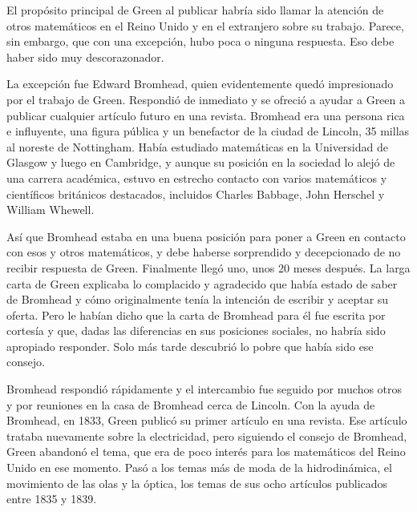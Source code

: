 \par
El propósito principal de Green al publicar habría sido llamar la atención de otros matemáticos en el Reino Unido y en el extranjero sobre su trabajo. Parece, sin embargo, que con una excepción, hubo poca o ninguna respuesta. Eso debe haber sido muy descorazonador.
\par
La excepción fue Edward Bromhead, quien evidentemente quedó impresionado por el trabajo de Green. Respondió de inmediato y se ofreció a ayudar a Green a publicar cualquier artículo futuro en una revista. Bromhead era una persona rica e influyente, una figura pública y un benefactor de la ciudad de Lincoln, 35 millas al noreste de Nottingham. Había estudiado matemáticas en la Universidad de Glasgow y luego
en Cambridge, y aunque su posición en la sociedad lo alejó de una carrera académica, estuvo en estrecho contacto con varios matemáticos y científicos británicos destacados, incluidos Charles Babbage, John Herschel y William Whewell.
\par
Así que Bromhead estaba en una buena posición para poner a Green en contacto con esos y otros matemáticos, y debe haberse sorprendido y decepcionado de no recibir respuesta de Green. Finalmente llegó uno, unos 20 meses después. La larga carta de Green explicaba lo complacido y agradecido que había estado de saber de Bromhead y cómo originalmente tenía la intención de escribir y aceptar su oferta. Pero le habían dicho que la carta de Bromhead para él fue escrita por cortesía y que, dadas las diferencias en sus posiciones sociales, no habría sido apropiado responder. Solo más tarde descubrió lo pobre que había sido ese consejo.
\par
Bromhead respondió rápidamente y el intercambio fue seguido por muchos otros y por reuniones en la casa de Bromhead cerca de Lincoln. Con la ayuda de Bromhead, en 1833, Green publicó su primer artículo en una revista. Ese artículo trataba nuevamente sobre la electricidad, pero siguiendo el consejo de Bromhead, Green abandonó el tema, que era de poco interés para los matemáticos del Reino Unido en ese momento. Pasó a los temas más de moda de la hidrodinámica, el movimiento de las olas y la óptica, los temas de sus ocho artículos publicados entre 1835 y 1839.
\par
